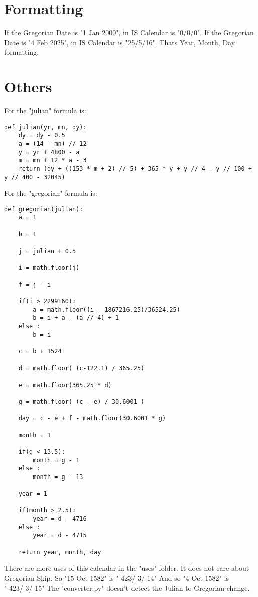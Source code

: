 \documentclass[11pt, letterpaper]{article}
\begin{document}
\section{Formatting}

If the Gregorian Date is "1 Jan 2000", in IS Calendar is "0/0/0". \newline
If the Gregorian Date is "4 Feb 2025", in IS Calendar is "25/5/16". \newline
Thats Year, Month, Day formatting. \newline

\section{Others}

For the "julian" formula is: \newline
\begin{lstlisting}
def julian(yr, mn, dy):
    dy = dy - 0.5
	a = (14 - mn) // 12
	y = yr + 4800 - a
	m = mn + 12 * a - 3
	return (dy + ((153 * m + 2) // 5) + 365 * y + y // 4 - y // 100 + y // 400 - 32045) 
\end{lstlisting}
For the "gregorian" formula is: \newline
\begin{lstlisting}
def gregorian(julian):
	a = 1

	b = 1

	j = julian + 0.5
	
	i = math.floor(j)

	f = j - i

	if(i > 2299160):
		a = math.floor((i - 1867216.25)/36524.25)
		b = i + a - (a // 4) + 1
	else :
		b = i

	c = b + 1524

	d = math.floor( (c-122.1) / 365.25)

	e = math.floor(365.25 * d)

	g = math.floor( (c - e) / 30.6001 )

	day = c - e + f - math.floor(30.6001 * g)

	month = 1

	if(g < 13.5):
		month = g - 1
	else :
		month = g - 13

	year = 1

	if(month > 2.5):
		year = d - 4716
	else :
		year = d - 4715

	return year, month, day  

\end{lstlisting}
There are more uses of this calendar in the "uses" folder. \newline
It does not care about Gregorian Skip. \newline
So "15 Oct 1582" is "-423/-3/-14" \newline
And so "4 Oct 1582" is "-423/-3/-15" \newline
The "converter.py" doesn't detect the Julian to Gregorian change.
\end{document}
